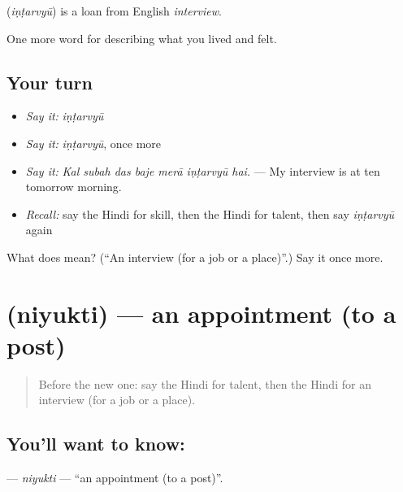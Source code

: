 \begin{cousinweb}
\textbf{} (\emph{iṇṭarvyū}) is a loan from English \emph{interview}.
\end{cousinweb}

\begin{grammarlens}[title={What you've built}]
One more word for describing what you lived and felt.
\end{grammarlens}

\subsection*{Your turn}
\begin{itemize}
\raggedright
  \item \emph{Say it:} \emph{iṇṭarvyū}
  \item \emph{Say it:} \emph{iṇṭarvyū}, once more
  \item \emph{Say it:} \emph{Kal subah das baje merā iṇṭarvyū hai.} — My interview is at ten tomorrow morning.
  \item \emph{Recall:} say the Hindi for skill, then the Hindi for talent, then say \emph{iṇṭarvyū} again
\end{itemize}

\begin{tcolorbox}[breakable,colback=teal!4,colframe=teal!35!black,title={Before you move on}]
What does  mean? (\textquotedblleft{}An interview (for a job or a place)\textquotedblright{}.) Say it once more.
\end{tcolorbox}
\section[\texorpdfstring{\hi{नियुक्ति} (niyukti)}{नियुक्ति (niyukti)}]{ (niyukti) — an appointment (to a post)}

\label{lesson:HI-C508-niyukti}



\begin{quote}
Before the new one: say the Hindi for talent, then the Hindi for an interview (for a job or a place).
\end{quote}

\subsection*{You'll want to know: }
\textbf{} — \emph{niyukti} — \textquotedblleft{}an appointment (to a post)\textquotedblright{}.

